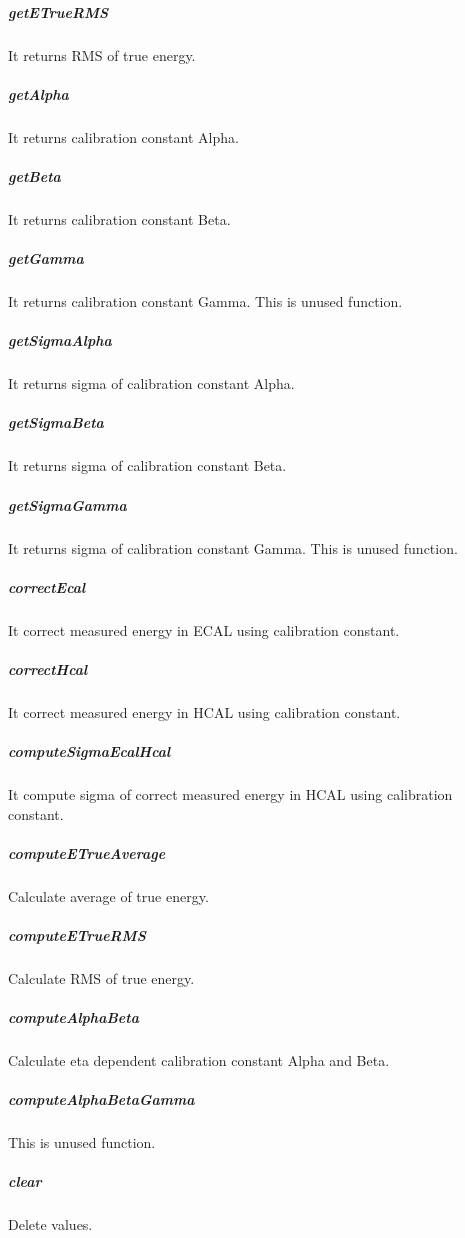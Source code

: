 \documentclass{cernrep}
\begin{document}
\subparagraph{getETrueRMS}

It returns RMS of true energy.

\subparagraph{getAlpha}

It returns calibration constant Alpha.

\subparagraph{getBeta}

It returns calibration constant Beta.

\subparagraph{getGamma}

It returns calibration constant Gamma. This is unused function.

\subparagraph{getSigmaAlpha}

It returns sigma of calibration constant Alpha.

\subparagraph{getSigmaBeta}

It returns sigma of calibration constant Beta.

\subparagraph{getSigmaGamma}

It returns sigma of calibration constant Gamma. This is unused function.

\subparagraph{correctEcal}

It correct measured energy in ECAL using calibration constant.

\subparagraph{correctHcal}

It correct measured energy in HCAL using calibration constant.

\subparagraph{computeSigmaEcalHcal}

It compute sigma of correct measured energy in HCAL using calibration constant.

\subparagraph{computeETrueAverage}

Calculate average of true energy.

\subparagraph{computeETrueRMS}

Calculate RMS of true energy.

\subparagraph{computeAlphaBeta}

Calculate eta dependent calibration constant Alpha and Beta.

\subparagraph{computeAlphaBetaGamma}

This is unused function.

\subparagraph{clear}

Delete values.
\end{document}
